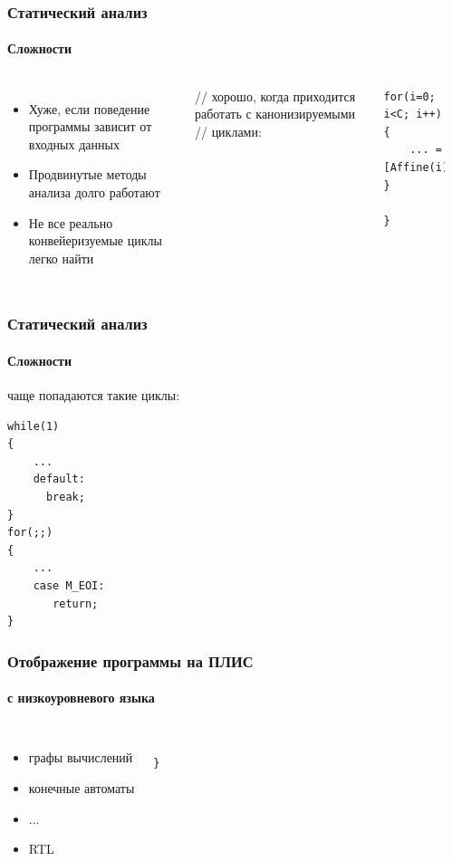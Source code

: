 \documentclass{beamer}              %
\begin{document}
\begin{frame}[fragile]
\frametitle{Статический анализ}
  \framesubtitle{Сложности}
  \begin{columns}
        \begin{itemize}
            \item Хуже, если поведение программы зависит от входных данных
            \item Продвинутые методы анализа долго работают
            \item Не все реально конвейеризуемые циклы легко найти
        \end{itemize}      


// хорошо, когда приходится работать с канонизируемыми
// циклами: 
\begin{lstlisting}[frame=single]
for(i=0; i<C; i++)
{
    ... = [Affine(i)];
}

}
\end{lstlisting}
\label{encode_listing}
      
  \end{columns}
  
\end{frame}

\begin{frame}[fragile]
\frametitle{Статический анализ}
  \framesubtitle{Сложности}
  
чаще попадаются такие циклы: 
\begin{lstlisting}[frame=single]
while(1)
{
    ...
    default:
      break;
}
for(;;)
{
    ...
    case M_EOI:
       return;
}

\end{lstlisting}
\label{encode_listing}

\end{frame}

\begin{frame}[fragile]
\frametitle{Отображение программы на ПЛИС}
  \framesubtitle{с низкоуровневого языка}
  \begin{columns}
        \begin{itemize}
            \item графы вычислений
            \item конечные автоматы
            \item ...
            \item RTL
        \end{itemize}      



\begin{lstlisting}[frame=single]

}
\end{lstlisting}
\label{encode_listing}
      
  \end{columns}
  
\end{frame}
\end{document}
